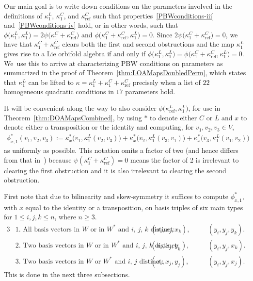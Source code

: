 \documentclass[10pt,a4paper]{amsart}
\numberwithin{equation}{section}
\DeclareMathOperator{\refl}{ref}
\begin{document}
Our main goal is to write down conditions on the parameters involved in the definitions
of $\kappa^L_1$, $\kappa^C_1$, and $\kappa^C_{\refl}$ such that properties~\eqref{PBWconditions-iii}
and~\eqref{PBWconditions-iv} hold, or in other words, such that
$\phi\big(\kappa^L_1,\kappa^L_1\big)=2\psi\big(\kappa^C_1+\kappa^C_{\refl}\big)$ and
$\phi\big(\kappa^C_1+\kappa^C_{\refl},\kappa^L_1\big)=0$.
Since $2\psi\big(\kappa^C_1+\kappa^C_{\refl}\big)=0$, we have that
$\kappa^C_1+\kappa^C_{\refl}$ clears both the first and second obstructions and
the map $\kappa^L_1$ gives rise to a Lie orbifold algebra if and only if
$\phi\big(\kappa^L_1,\kappa^L_1\big)=\phi\big(\kappa^C_1+\kappa^C_{\refl},\kappa^L_1\big)=0$. We~use this to arrive at characterizing PBW conditions on parameters as summarized in
the proof of
Theorem~\ref{thm:LOAMapsDoubledPerm}, which states that $\kappa^L_1$ can
be lifted to $\kappa=\kappa^L_1+\kappa^C_1+\kappa^C_{\refl}$ precisely when a list of $22$
homogeneous quadratic conditions in $17$ parameters hold.

It will be convenient along the way to also consider $\phi\big(\kappa^L_{\refl},\kappa^L_1\big)$,
for use in Theorem~\ref{thm:DOAMapsCombined}, by using $*$ to denote
either $C$ or $L$ and $x$ to denote either a transposition or the identity and
computing, for $v_1,v_2,v_3 \in V$,
\begin{gather*}
\phi_{x,1}^*(v_1,v_2,v_3):=\kappa^*_x\big(v_1,\kappa^L_1(v_2,v_3)\big)
+\kappa^*_x\big(v_2,\kappa^L_1(v_3,v_1)\big)+\kappa^*_x\big(v_3,\kappa^L_1(v_1,v_2)\big)
\end{gather*}
as uniformly as possible.
This notation omits a factor of two (and hence differs from that in~\cite{FGK})
because $\psi(\kappa^C_1+\kappa^C_{\refl})=0$ means the factor of 2 is irrelevant to
clearing the first obstruction and it is also irrelevant to clearing
the second obstruction.

First note that due to bilinearity and skew-symmetry it suffices to compute $\phi_{x,1}^*$,
with $x$ equal to the identity or a transposition, on basis triples of six main types
for $1 \leq i, j, k \leq n$, where $n\geq 3$.
\begin{alignat*}{3}
&\text{1.\ All basis vectors in $W$ or in $W^*$ and $i$, $j$, $k$ distinct:} &\hspace{10pt}
& (x_i,x_j,x_k), & &\quad (y_i,y_j,y_k). \\
&\text{2.\ Two basis vectors in $W$ or in $W^*$ and $i$, $j$, $k$ distinct:} &\hspace{10pt}
& (x_i,x_j,y_k), & &\quad (y_i,y_j,x_k). \\
&\text{3.\ Two basis vectors in $W$ or $W^*$ and $i$, $j$ distinct:} &\hspace{10pt}
& (x_i,x_j,y_j), & &\quad (y_i,y_j,x_j).
\end{alignat*}
This is done in the next three subsections.
\end{document}
